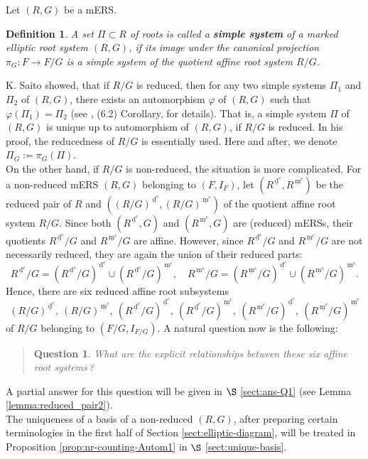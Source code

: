 \documentclass[11pt]{amsart}
\newcommand{\dc}{\,\underline{\mathrm{d}}^c}
\newcommand{\mc}{\, \underline{\mathrm{m}}^c}
\newtheorem{defn}{Definition}[section]
\begin{document}
Let $(R,G)$ be a mERS. 
\begin{defn}\label{defn:basis}
A set $\Pi \subset R$ of roots
is called a \textbf{simple system} of a 
marked elliptic root system $(R,G)$, if its image under the canonical projection 
$\pi_G:F\to F/G$ is a simple system of the quotient affine root system $R/G$. 
\end{defn}
K. Saito \cite{Saito1985} showed, that if  $R/G$ is reduced, then for any two 
{simple systems} $\Pi_1$ and $\Pi_2$ of $(R,G)$, there exists an automorphism $\varphi$ of 
$(R,G)$ such that $\varphi(\Pi_1)=\Pi_2$ (see \cite{Saito1985}, (6.2) 
Corollary, for details).  That is, a {simple system} $\Pi$ of $(R,G)$
is unique up to automorphism of $(R,G)$, if $R/G$ is reduced. In 
his proof, the reducedness of $R/G$ is essentially used. {Here and after,
we denote $\Pi_G:=\pi_G(\Pi)$.}\\

On the other hand, if $R/G$ is non-reduced, the situation is more 
complicated. For a non-reduced mERS $(R,G)$ belonging to $(F,I_F)$, 
let $(R^{\dc},R^{\mc})$ be the reduced pair of $R$ and $((R/G)^{\dc},(R/G)^{\mc})$ of the 
quotient affine root system $R/G$. Since both $(R^{\dc},G)$ and $(R^{\mc},G)$ are 
(reduced) mERSs, their quotients $R^{\dc}/G$ and $R^{\mc}/G$ are 
affine.
However, since $R^{\dc}/G$ and $R^{\mc}/G$ are
not necessarily reduced, they are again the union of their reduced parts:
\[R^{\dc}/G=(R^{\dc}{/}G)^{\dc}\cup (R^{\dc}/G)^{\mc},\quad R^{\mc}/G=(R^{\mc}/G)^{\dc}\cup (R^{\mc}/G)^{\mc}.\]
Hence, there are six reduced affine root subsystems 
\[(R/G)^{\dc},\ (R/G)^{\mc},\ (R^{\dc}/G)^{\dc},\ (R^{\dc}/G)^{\mc},\ (R^{\mc}/G)^{\dc},\ (R^{\mc}/G)^{\mc}\]
of $R/G$ belonging to $(F/G,I_{F/G})$. A natural question now is the following: 

\vskip 2.5mm
\begin{quotation}
{\bf Question 1}. 
{\it What are the explicit relationships between these six affine root systems\,?}
\end{quotation}
\vskip 2.5mm
A partial answer for this question will be given in 
$\S$ \ref{sect:ans-Q1} (see Lemma \ref{lemma:reduced_pair2}).  \\

The uniqueness of a basis of a non-reduced $(R,G)$, 
after preparing certain terminologies in the first half of Section \ref{sect:elliptic-diagram},  will be treated in 
Proposition \ref{prop:nr-counting-Autom1} in $\S$ \ref{sect:unique-basis}.  \\
\end{document}
